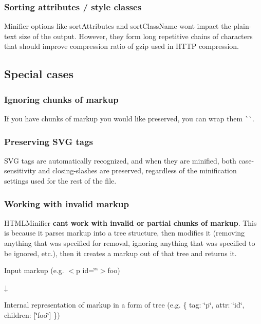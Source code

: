 \subsubsection*{Sorting attributes / style classes}

Minifier options like {\ttfamily sort\+Attributes} and {\ttfamily sort\+Class\+Name} won\textquotesingle{}t impact the plain-\/text size of the output. However, they form long repetitive chains of characters that should improve compression ratio of gzip used in H\+T\+TP compression.

\subsection*{Special cases}

\subsubsection*{Ignoring chunks of markup}

If you have chunks of markup you would like preserved, you can wrap them \`{}\`{}.

\subsubsection*{Preserving S\+VG tags}

S\+VG tags are automatically recognized, and when they are minified, both case-\/sensitivity and closing-\/slashes are preserved, regardless of the minification settings used for the rest of the file.

\subsubsection*{Working with invalid markup}

H\+T\+M\+L\+Minifier {\bfseries can\textquotesingle{}t work with invalid or partial chunks of markup}. This is because it parses markup into a tree structure, then modifies it (removing anything that was specified for removal, ignoring anything that was specified to be ignored, etc.), then it creates a markup out of that tree and returns it.

Input markup (e.\+g. {\ttfamily $<$p id=\char`\"{}\char`\"{}$>$foo})

↓

Internal representation of markup in a form of tree (e.\+g. {\ttfamily \{ tag\+: \char`\"{}p\char`\"{}, attr\+: \char`\"{}id\char`\"{}, children\+: \mbox{[}\char`\"{}foo\char`\"{}\mbox{]} \}})

